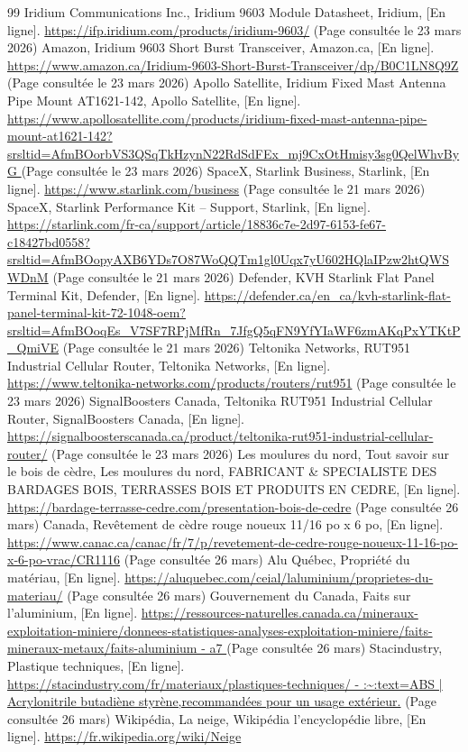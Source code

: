 \begin{thebibliographyUL}{99}
     Iridium Communications Inc., Iridium 9603 Module Datasheet, Iridium, [En ligne]. \url{https://ifp.iridium.com/products/iridium-9603/} (Page consultée le 23 mars 2026)
     Amazon, Iridium 9603 Short Burst Transceiver, Amazon.ca, [En ligne]. \url{https://www.amazon.ca/Iridium-9603-Short-Burst-Transceiver/dp/B0C1LN8Q9Z} (Page consultée le 23 mars 2026)
     Apollo Satellite, Iridium Fixed Mast Antenna Pipe Mount AT1621-142, Apollo Satellite, [En ligne]. \url{https://www.apollosatellite.com/products/iridium-fixed-mast-antenna-pipe-mount-at1621-142?srsltid=AfmBOorbVS3QSqTkHzynN22RdSdFEx_mj9CxOtHmisy3sg0QelWhvByG }(Page consultée le 23 mars 2026)
     SpaceX, Starlink Business, Starlink, [En ligne]. \url{https://www.starlink.com/business} (Page consultée le 21 mars 2026)
     SpaceX, Starlink Performance Kit – Support, Starlink, [En ligne]. \url{https://starlink.com/fr-ca/support/article/18836c7e-2d97-6153-fe67-c18427bd0558?srsltid=AfmBOopyAXB6YDs7O87WoQQTm1gl0Uqx7yU602HQlaIPzw2htQWSWDnM} (Page consultée le 21 mars 2026)
     Defender, KVH Starlink Flat Panel Terminal Kit, Defender, [En ligne]. \url{https://defender.ca/en_ca/kvh-starlink-flat-panel-terminal-kit-72-1048-oem?srsltid=AfmBOoqEs_V7SF7RPjMfRn_7JfgQ5qFN9YfYIaWF6zmAKqPxYTKtP_QmiVE} (Page consultée le 21 mars 2026)
     Teltonika Networks, RUT951 Industrial Cellular Router, Teltonika Networks, [En ligne]. \url{https://www.teltonika-networks.com/products/routers/rut951} (Page consultée le 23 mars 2026)
     SignalBoosters Canada, Teltonika RUT951 Industrial Cellular Router, SignalBoosters Canada, [En ligne]. \url{https://signalboosterscanada.ca/product/teltonika-rut951-industrial-cellular-router/} (Page consultée le 23 mars 2026)
     Les moulures du nord, Tout savoir sur le bois de cèdre, Les moulures du nord, FABRICANT \& SPECIALISTE DES BARDAGES BOIS, TERRASSES BOIS ET PRODUITS EN CEDRE, [En ligne]. \url{https://bardage-terrasse-cedre.com/presentation-bois-de-cedre} (Page consultée 26 mars)
     Canada, Revêtement de cèdre rouge noueux 11/16 po x 6 po, [En ligne]. \url{https://www.canac.ca/canac/fr/7/p/revetement-de-cedre-rouge-noueux-11-16-po-x-6-po-vrac/CR1116} (Page consultée 26 mars)
     Alu Québec, Propriété du matériau, [En ligne]. \url{https://aluquebec.com/ceial/laluminium/proprietes-du-materiau/} (Page consultée 26 mars)
     Gouvernement du Canada, Faits sur l'aluminium, [En ligne]. \url{https://ressources-naturelles.canada.ca/mineraux-exploitation-miniere/donnees-statistiques-analyses-exploitation-miniere/faits-mineraux-metaux/faits-aluminium - a7 } (Page consultée 26 mars)
     Stacindustry, Plastique techniques, [En ligne]. \url{https://stacindustry.com/fr/materiaux/plastiques-techniques/ - :~:text=ABS | Acrylonitrile butadiène styrène,recommandées pour un usage extérieur.} (Page consultée 26 mars)
     Wikipédia, La neige, Wikipédia l'encyclopédie libre, [En ligne]. \url{https://fr.wikipedia.org/wiki/Neige}
\end{thebibliographyUL}
